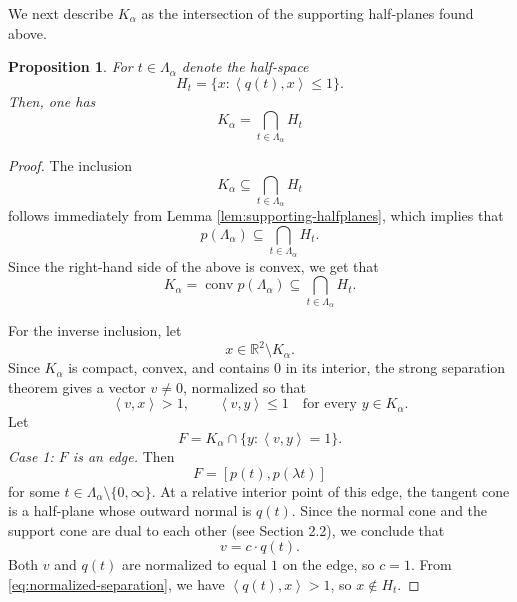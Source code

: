 \documentclass[12pt]{article}
\newtheorem{proposition}[theorem]{Proposition}
\theoremstyle{remark}
\newcommand{\R}{\mathbb R}
\newcommand{\conv}{\operatorname{conv}}
\newcommand{\ip}[2]{\left\langle #1,#2\right\rangle}
\begin{document}
We next describe $K_\alpha$ as the intersection of the supporting half-planes found above.


\begin{proposition}\label{prop:halfplane-representation}
For $t \in \Lambda_{\alpha}$ denote the half-space
\[
        H_t=\{x:\ip{q(t)}{x}\le 1\}.
\]
Then, one has
\begin{equation}\label{eq:halfplane-representation}
        K_\alpha
        =
        \bigcap_{t\in\Lambda_\alpha} H_t
\end{equation}
\end{proposition}

\begin{proof}
The inclusion
\[
        K_\alpha
        \subseteq
        \bigcap_{t\in\Lambda_\alpha} H_t\]
follows immediately from Lemma \ref{lem:supporting-halfplanes}, which implies that 
\[
p\left(\Lambda_{\alpha}\right) \subseteq         \bigcap_{t\in\Lambda_\alpha}
        H_t.
\]
Since the right-hand side of the above is convex, we get that
\[
K_{\alpha} = \conv{p\left(\Lambda_{\alpha}\right)} \subseteq \bigcap_{t\in\Lambda_\alpha}H_t.
\]


For the inverse inclusion, let 
\[
        x\in \R^2\setminus K_\alpha.
\]
Since $K_\alpha$ is compact, convex, and contains $0$ in its interior, the strong separation theorem gives a vector $v\ne0$, normalized so that
\begin{equation}\label{eq:normalized-separation}
        \ip{v}{x}>1,
        \qquad
        \ip{v}{y}\le 1\quad\text{for every }y\in K_\alpha.
\end{equation}
Let
\[
        F=K_\alpha\cap\{y:\ip{v}{y}=1\}.
\]
\smallskip
\noindent\emph{Case 1: $F$ is an edge.}
Then
\[
        F=[p(t),p(\lambda t)]
\]
for some $t\in\Lambda_\alpha\setminus\{0,\infty\}$. At a relative interior point of this edge, the tangent cone is a half-plane whose outward normal is $q(t)$. Since the normal cone and the support cone are dual to each other (see \cite{schneider} Section 2.2), we conclude that 
\[
        v = c\cdot q(t).
\]
Both $v$ and $q(t)$ are normalized to equal $1$ on the edge, so $c=1$. From \eqref{eq:normalized-separation},
we have $\ip{q(t)}{x}>1$, so $x\notin H_t$.


\end{proof}
\end{document}
